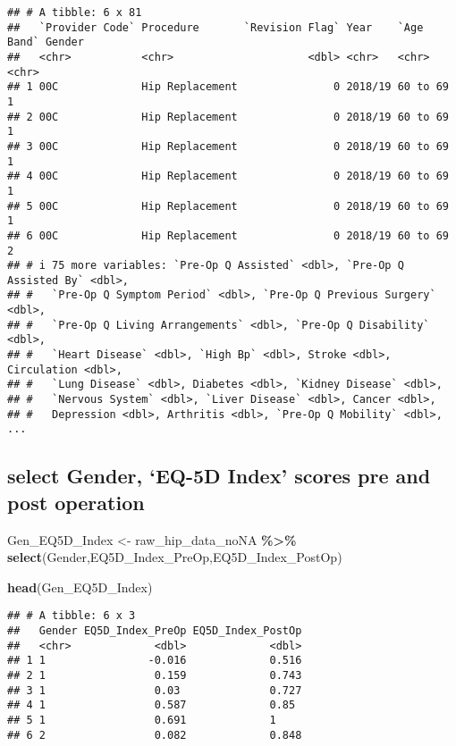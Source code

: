 \documentclass[
]{article}
\newenvironment{Shaded}{\begin{snugshade}}{\end{snugshade}}
\newcommand{\FunctionTok}[1]{\textcolor[rgb]{0.13,0.29,0.53}{\textbf{#1}}}
\newcommand{\NormalTok}[1]{#1}
\newcommand{\OtherTok}[1]{\textcolor[rgb]{0.56,0.35,0.01}{#1}}
\newcommand{\SpecialCharTok}[1]{\textcolor[rgb]{0.81,0.36,0.00}{\textbf{#1}}}
\newcommand{\StringTok}[1]{\textcolor[rgb]{0.31,0.60,0.02}{#1}}
\begin{document}
\begin{verbatim}
## # A tibble: 6 x 81
##   `Provider Code` Procedure       `Revision Flag` Year    `Age Band` Gender
##   <chr>           <chr>                     <dbl> <chr>   <chr>      <chr> 
## 1 00C             Hip Replacement               0 2018/19 60 to 69   1     
## 2 00C             Hip Replacement               0 2018/19 60 to 69   1     
## 3 00C             Hip Replacement               0 2018/19 60 to 69   1     
## 4 00C             Hip Replacement               0 2018/19 60 to 69   1     
## 5 00C             Hip Replacement               0 2018/19 60 to 69   1     
## 6 00C             Hip Replacement               0 2018/19 60 to 69   2     
## # i 75 more variables: `Pre-Op Q Assisted` <dbl>, `Pre-Op Q Assisted By` <dbl>,
## #   `Pre-Op Q Symptom Period` <dbl>, `Pre-Op Q Previous Surgery` <dbl>,
## #   `Pre-Op Q Living Arrangements` <dbl>, `Pre-Op Q Disability` <dbl>,
## #   `Heart Disease` <dbl>, `High Bp` <dbl>, Stroke <dbl>, Circulation <dbl>,
## #   `Lung Disease` <dbl>, Diabetes <dbl>, `Kidney Disease` <dbl>,
## #   `Nervous System` <dbl>, `Liver Disease` <dbl>, Cancer <dbl>,
## #   Depression <dbl>, Arthritis <dbl>, `Pre-Op Q Mobility` <dbl>, ...
\end{verbatim}

\subsection{select Gender, `EQ-5D Index' scores pre and post
operation}\label{select-gender-eq-5d-index-scores-pre-and-post-operation}

\begin{Shaded}
\begin{Highlighting}[]
\NormalTok{Gen\_EQ5D\_Index }\OtherTok{\textless{}{-}}\NormalTok{ raw\_hip\_data\_noNA }\SpecialCharTok{\%\textgreater{}\%} 
  \FunctionTok{select}\NormalTok{(}\StringTok{\textquotesingle{}Gender\textquotesingle{}}\NormalTok{,}\StringTok{\textquotesingle{}EQ5D\_Index\_PreOp\textquotesingle{}}\NormalTok{,}\StringTok{\textquotesingle{}EQ5D\_Index\_PostOp\textquotesingle{}}\NormalTok{)}

\FunctionTok{head}\NormalTok{(Gen\_EQ5D\_Index)}
\end{Highlighting}
\end{Shaded}

\begin{verbatim}
## # A tibble: 6 x 3
##   Gender EQ5D_Index_PreOp EQ5D_Index_PostOp
##   <chr>             <dbl>             <dbl>
## 1 1                -0.016             0.516
## 2 1                 0.159             0.743
## 3 1                 0.03              0.727
## 4 1                 0.587             0.85 
## 5 1                 0.691             1    
## 6 2                 0.082             0.848
\end{verbatim}
\end{document}
